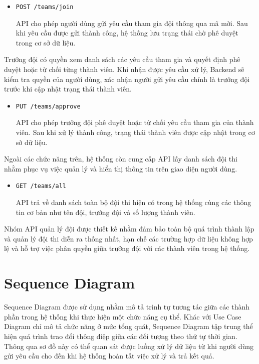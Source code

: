 \begin{itemize}
	\item \texttt{POST /teams/join}
	
	API cho phép người dùng gửi yêu cầu tham gia đội thông qua mã mời. Sau khi yêu cầu được gửi thành công, hệ thống lưu trạng thái chờ phê duyệt trong cơ sở dữ liệu.
\end{itemize}

Trưởng đội có quyền xem danh sách các yêu cầu tham gia và quyết định phê duyệt hoặc từ chối từng thành viên. Khi nhận được yêu cầu xử lý, Backend sẽ kiểm tra quyền của người dùng, xác nhận người gửi yêu cầu chính là trưởng đội trước khi cập nhật trạng thái thành viên.

\begin{itemize}
	\item \texttt{PUT /teams/approve}
	
	API cho phép trưởng đội phê duyệt hoặc từ chối yêu cầu tham gia của thành viên. Sau khi xử lý thành công, trạng thái thành viên được cập nhật trong cơ sở dữ liệu.
\end{itemize}

Ngoài các chức năng trên, hệ thống còn cung cấp API lấy danh sách đội thi nhằm phục vụ việc quản lý và hiển thị thông tin trên giao diện người dùng.

\begin{itemize}
	\item \texttt{GET /teams/all}
	
	API trả về danh sách toàn bộ đội thi hiện có trong hệ thống cùng các thông tin cơ bản như tên đội, trưởng đội và số lượng thành viên.
\end{itemize}

Nhóm API quản lý đội được thiết kế nhằm đảm bảo toàn bộ quá trình thành lập và quản lý đội thi diễn ra thống nhất, hạn chế các trường hợp dữ liệu không hợp lệ và hỗ trợ việc phân quyền giữa trưởng đội với các thành viên trong hệ thống.

\section{Sequence Diagram}

Sequence Diagram được sử dụng nhằm mô tả trình tự tương tác giữa các thành phần trong hệ thống khi thực hiện một chức năng cụ thể. Khác với Use Case Diagram chỉ mô tả chức năng ở mức tổng quát, Sequence Diagram tập trung thể hiện quá trình trao đổi thông điệp giữa các đối tượng theo thứ tự thời gian. Thông qua sơ đồ này có thể quan sát được luồng xử lý dữ liệu từ khi người dùng gửi yêu cầu cho đến khi hệ thống hoàn tất việc xử lý và trả kết quả.

